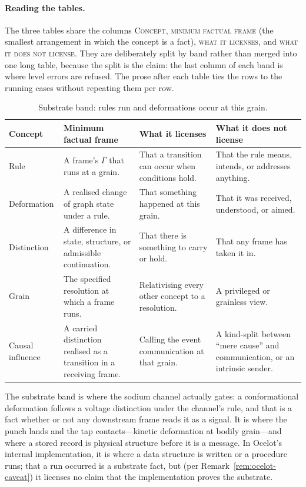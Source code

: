 \documentclass[11pt,a4paper]{article}
\theoremstyle{remark}\newtheorem{remark}[definition]{Remark}
\begin{document}
\paragraph{Reading the tables.} The three tables share the columns
\textsc{Concept}, \textsc{minimum factual frame} (the smallest arrangement in
which the concept is a fact), \textsc{what it licenses}, and \textsc{what it does
not license}. They are deliberately split by band rather than merged into one
long table, because the split is the claim: the last column of each band is where
level errors are refused. The prose after each table ties the rows to the running
cases without repeating them per row.

\begingroup\small
\begin{table}[t]\centering\small
\caption{Substrate band: rules run and deformations occur at this grain.}
\label{tab:band-substrate}
\begin{tabular}{@{}>{\raggedright\arraybackslash}p{}>{\raggedright\arraybackslash}p{}>{\raggedright\arraybackslash}p{}>{\raggedright\arraybackslash}p{}@{}}
\toprule
\textbf{Concept} & \textbf{Minimum factual frame} & \textbf{What it licenses} & \textbf{What it does not license}\\
\midrule
Rule & A frame's $\Gamma$ that runs at a grain. & That a transition can occur when conditions hold. & That the rule means, intends, or addresses anything.\\
Deformation & A realised change of graph state under a rule. & That something happened at this grain. & That it was received, understood, or aimed.\\
Distinction & A difference in state, structure, or admissible continuation. & That there is something to carry or hold. & That any frame has taken it in.\\
Grain & The specified resolution at which a frame runs. & Relativising every other concept to a resolution. & A privileged or grainless view.\\
Causal influence & A carried distinction realised as a transition in a receiving frame. & Calling the event communication at that grain. & A kind-split between ``mere cause'' and communication, or an intrinsic sender.\\
\bottomrule
\end{tabular}
\end{table}
\endgroup

The substrate band is where the sodium channel actually gates: a
conformational deformation follows a voltage distinction under the channel's rule,
and that is a fact whether or not any downstream frame reads it as a signal. It is
where the punch lands and the tap contacts---kinetic deformation at bodily
grain---and where a stored record is physical structure before it is a message. In
Ocelot's internal implementation, it is where a data structure is written or a
procedure runs; that a run occurred is a substrate fact, but (per
Remark~\ref{rem:ocelot-caveat}) it licenses no claim that the implementation
proves the substrate.
\end{document}
